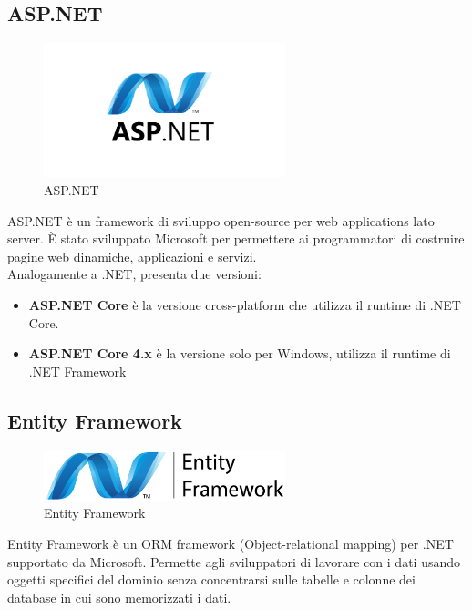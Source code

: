 \subsection{ASP.NET}
\begin{figure}[h]
\begin{center}
	\includegraphics[width=7cm]{images/aspnet.png}
	\caption{ASP.NET}\label{fig:aspnet}
\end{center}
\end{figure}
ASP.NET è un framework di sviluppo open-source per web applications lato server. È stato sviluppato Microsoft per permettere ai programmatori di costruire pagine web dinamiche, applicazioni e servizi.\cite{ASPNET}\\
Analogamente a .NET, presenta due versioni:
\begin{itemize}
\item \textbf{ASP.NET Core} è la versione cross-platform che utilizza il runtime di .NET Core.
\item \textbf{ASP.NET Core 4.x} è la versione solo per Windows, utilizza il runtime di .NET Framework
\end{itemize}

\subsection{Entity Framework}
\begin{figure}[h]
\begin{center}
	\includegraphics[width=7cm]{images/entityframework.png}
	\caption{Entity Framework}\label{fig:entityframework}
\end{center}
\end{figure}
Entity Framework è un ORM framework (Object-relational mapping) per .NET supportato da Microsoft. Permette agli sviluppatori di lavorare con i dati usando oggetti specifici del dominio senza concentrarsi sulle tabelle e colonne dei database in cui sono memorizzati i dati.
